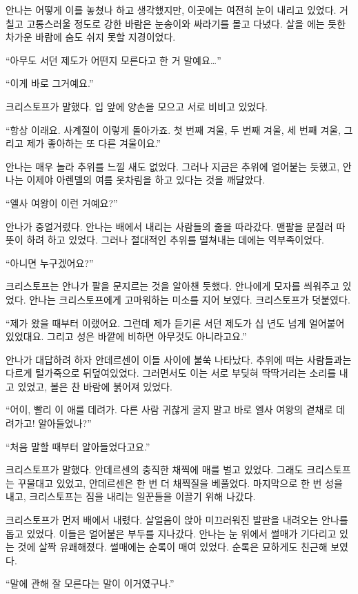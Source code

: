 안나는 어떻게 이를 놓쳤나 하고 생각했지만, 이곳에는 여전히 눈이 내리고 있었다. 거칠고 고통스러울 정도로 강한 바람은 눈송이와 싸라기를 몰고 다녔다. 살을 에는 듯한 차가운 바람에 숨도 쉬지 못할 지경이었다.

``아무도 서던 제도가 어떤지 모른다고 한 거 말예요\ldots''

``이게 바로 그거예요.''

크리스토프가 말했다. 입 앞에 양손을 모으고 서로 비비고 있었다.

``항상 이래요. 사계절이 이렇게 돌아가죠. 첫 번째 겨울, 두 번째 겨울, 세 번째 겨울, 그리고 제가 좋아하는 또 다른 겨울이요.''

안나는 매우 놀라 추위를 느낄 새도 없었다. 그러나 지금은 추위에 얼어붙는 듯했고, 안나는 이제야 아렌델의 여름 옷차림을 하고 있다는 것을 깨달았다.

``엘사 여왕이 이런 거예요?''

안나가 중얼거렸다. 안나는 배에서 내리는 사람들의 줄을 따라갔다. 맨팔을 문질러 따뜻이 하려 하고 있었다. 그러나 절대적인 추위를 떨쳐내는 데에는 역부족이었다.

``아니면 누구겠어요?''

크리스토프는 안나가 팔을 문지르는 것을 알아챈 듯했다. 안나에게 모자를 씌워주고 있었다. 안나는 크리스토프에게 고마워하는 미소를 지어 보였다. 크리스토프가 덧붙였다.

``제가 왔을 때부터 이랬어요. 그런데 제가 듣기론 서던 제도가 십 년도 넘게 얼어붙어 있었대요. 그리고 성은 바깥에 비하면 아무것도 아니라고요.''

안나가 대답하려 하자 안데르센이 이들 사이에 불쑥 나타났다. 추위에 떠는 사람들과는 다르게 털가죽으로 뒤덮여있었다. 그러면서도 이는 서로 부딪혀 딱딱거리는 소리를 내고 있었고, 볼은 찬 바람에 붉어져 있었다.

``어이, 빨리 이 애를 데려가. 다른 사람 귀찮게 굴지 말고 바로 엘사 여왕의 곁채로 데려가고! 알아들었나?''

``처음 말할 때부터 알아들었다고요.''

크리스토프가 말했다. 안데르센의 충직한 채찍에 매를 벌고 있었다. 그래도 크리스토프는 꾸물대고 있었고, 안데르센은 한 번 더 채찍질을 베풀었다. 마지막으로 한 번 성을 내고, 크리스토프는 짐을 내리는 일꾼들을 이끌기 위해 나갔다.

크리스토프가 먼저 배에서 내렸다. 살얼음이 앉아 미끄러워진 발판을 내려오는 안나를 돕고 있었다. 이들은 얼어붙은 부두를 지나갔다. 안나는 눈 위에서 썰매가 기다리고 있는 것에 살짝 유쾌해졌다. 썰매에는 순록이 매여 있었다. 순록은 묘하게도 친근해 보였다.

``말에 관해 잘 모른다는 말이 이거였구나.''

